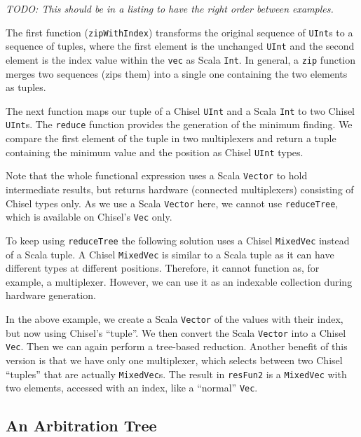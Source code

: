 \documentclass[%
    10pt,
    headinclude, footinclude=false,
    openright, %
    notitlepage,
    cleardoublepage=empty,
    headsepline,
    numbers=noenddot,
    bibliography=totoc, index=totoc,
    ]{scrbook}
\newcommand{\code}[1]{{\lstinline[basicstyle=\small\ttfamily]{#1}}}
\newcommand{\todo}[1]{{\emph{TODO: #1}}}
\begin{document}
\todo{This should be in a listing to have the right order between examples.}


The first function (\code{zipWithIndex})
transforms the original sequence of \code{UInt}s to a sequence of tuples, where the first element is the
unchanged \code{UInt} and the second element is the index value within the \code{vec} as Scala \code{Int}.
In general, a \code{zip} function merges two sequences (zips them) into a single one
containing the two elements as tuples.

The next function maps our tuple of a Chisel \code{UInt}
and a Scala \code{Int} to two Chisel \code{UInt}s. The \code{reduce} function provides the generation of
the minimum finding. We compare the first element of the tuple in two multiplexers and return
a tuple containing the minimum value and the position as Chisel \code{UInt} types.


Note that the whole functional expression uses a Scala \code{Vector} to hold intermediate results,
but returns hardware (connected multiplexers) consisting of Chisel types only.
As we use a Scala \code{Vector} here, we cannot use \code{reduceTree}, which is available on Chisel's
\code{Vec} only.

To keep using \code{reduceTree} the following solution uses a Chisel \code{MixedVec}
instead of a Scala tuple.
A Chisel \code{MixedVec} is similar to a Scala tuple as it can have different types at different positions.
Therefore, it cannot function as, for example, a multiplexer. However, we can use it as an
indexable collection during hardware generation.



In the above example, we create a Scala \code{Vector} of the values with their index, but now
using Chisel's ``tuple''. We then convert the Scala \code{Vector} into a Chisel \code{Vec}.
Then we can again perform a tree-based reduction. Another benefit of this version is
that we have only one multiplexer, which selects between two Chisel ``tuples'' that are actually
\code{MixedVec}s.
The result in \code{resFun2} is a \code{MixedVec} with two elements,
accessed with an index, like a ``normal'' \code{Vec}.

\subsection{An Arbitration Tree}
\label{sec:arbiter}
\end{document}
